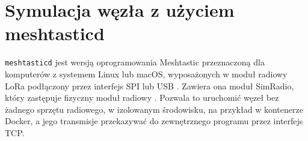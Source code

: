 \documentclass[12pt,a4paper,twoside]{report}
\theoremstyle{definition} %
\begin{document}
\section{Symulacja węzła z użyciem meshtasticd}
\texttt{meshtasticd} jest wersją oprogramowania Meshtastic przeznaczoną dla komputerów z systemem Linux lub macOS, wyposażonych w moduł radiowy LoRa podłączony przez interfejs SPI lub USB \cite{meshtasticd_docs}. Zawiera ona moduł SimRadio, który zastępuje fizyczny moduł radiowy \cite{meshtastic_firmware}. Pozwala to uruchomić węzeł bez żadnego sprzętu radiowego, w izolowanym środowisku, na przykład w kontenerze Docker, a jego transmisje przekazywać do zewnętrznego programu przez interfejs TCP.

\cleardoublepage


\cleardoublepage


\cleardoublepage


    \cleardoublepage
    
\end{document}

